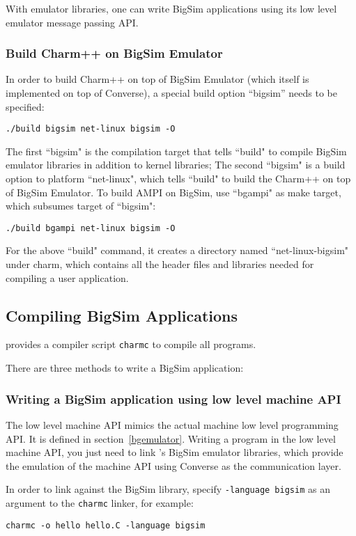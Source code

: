 With emulator libraries, one can write BigSim applications using its
low level emulator message passing API.

\subsubsection{Build Charm++ on BigSim Emulator}

In order to build Charm++ on top of BigSim Emulator (which itself is 
implemented on top of Converse), a special build option ``bigsim''
needs to be specified:
\begin{verbatim}
./build bigsim net-linux bigsim -O
\end{verbatim}

The first ``bigsim" is the compilation target that tells ``build" to
compile BigSim emulator libraries in addition to \charmpp{} kernel libraries;
The second ``bigsim" is a build option to platform ``net-linux", which tells
``build" to build the Charm++ on top of BigSim Emulator. 
To build AMPI on BigSim, use ``bgampi" as make target, which subsumes target
of ``bigsim":
\begin{verbatim}
./build bgampi net-linux bigsim -O
\end{verbatim}

For the above ``build" command, it creates a directory named 
``net-linux-bigsim" under charm, which contains all the header files and
libraries needed for compiling a user application.

\subsection{Compiling BigSim Applications}

\charmpp{} provides a compiler script {\tt charmc} to compile all programs.

There are three methods to write a BigSim application:

\subsubsection{Writing a BigSim application using low level machine API}
The low level machine API mimics the actual machine low level programming
API. It is defined in section~\ref{bgemulator}. Writing a program in the 
low level machine API, you just need to link \charmpp{}'s BigSim emulator
libraries, which provide the emulation of the machine API using Converse as
the communication layer.

In order to link against the BigSim library, specify 
\texttt{-language bigsim} as an argument to the {\tt charmc} linker, 
for example:
\begin{verbatim}
charmc -o hello hello.C -language bigsim
\end{verbatim}

